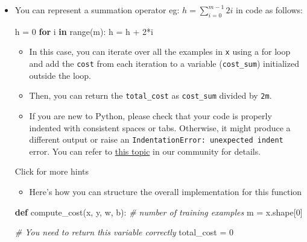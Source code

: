 \documentclass[11pt]{article}
\providecommand{\tightlist}{%
      \setlength{\itemsep}{0pt}\setlength{\parskip}{0pt}}
\newenvironment{Shaded}{}{}
\newcommand{\KeywordTok}[1]{\textcolor[rgb]{0.00,0.44,0.13}{\textbf{{#1}}}}
\newcommand{\DecValTok}[1]{\textcolor[rgb]{0.25,0.63,0.44}{{#1}}}
\newcommand{\CommentTok}[1]{\textcolor[rgb]{0.38,0.63,0.69}{\textit{{#1}}}}
\newcommand{\NormalTok}[1]{{#1}}
\newcommand{\ControlFlowTok}[1]{\textcolor[rgb]{0.00,0.44,0.13}{\textbf{{#1}}}}
\newcommand{\OperatorTok}[1]{\textcolor[rgb]{0.40,0.40,0.40}{{#1}}}
\newcommand{\BuiltInTok}[1]{{#1}}
\begin{document}
\begin{itemize}
\item
  You can represent a summation operator eg:
  \(h = \sum\limits_{i = 0}^{m-1} 2i\) in code as follows:

\begin{Shaded}
\begin{Highlighting}[]
\NormalTok{h }\OperatorTok{=} \DecValTok{0}
\ControlFlowTok{for}\NormalTok{ i }\KeywordTok{in} \BuiltInTok{range}\NormalTok{(m):}
\NormalTok{    h }\OperatorTok{=}\NormalTok{ h }\OperatorTok{+} \DecValTok{2}\OperatorTok{*}\NormalTok{i}
\end{Highlighting}
\end{Shaded}

  \begin{itemize}
  \item
    In this case, you can iterate over all the examples in \texttt{x}
    using a for loop and add the \texttt{cost} from each iteration to a
    variable (\texttt{cost\_sum}) initialized outside the loop.
  \item
    Then, you can return the \texttt{total\_cost} as \texttt{cost\_sum}
    divided by \texttt{2m}.
  \item
    If you are new to Python, please check that your code is properly
    indented with consistent spaces or tabs. Otherwise, it might produce
    a different output or raise an
    \texttt{IndentationError:\ unexpected\ indent} error. You can refer
    to
    \href{https://community.deeplearning.ai/t/indentation-in-python-indentationerror-unexpected-indent/159398}{this
    topic} in our community for details.
  \end{itemize}

  Click for more hints

  \begin{itemize}
  \tightlist
  \item
    Here's how you can structure the overall implementation for this
    function
  \end{itemize}

\begin{Shaded}
\begin{Highlighting}[]
 \KeywordTok{def}\NormalTok{ compute\_cost(x, y, w, b):}
     \CommentTok{\# number of training examples}
\NormalTok{     m }\OperatorTok{=}\NormalTok{ x.shape[}\DecValTok{0}\NormalTok{] }

     \CommentTok{\# You need to return this variable correctly}
\NormalTok{     total\_cost }\OperatorTok{=} \DecValTok{0}


\end{Highlighting}
\end{Shaded}
\end{itemize}
\end{document}
